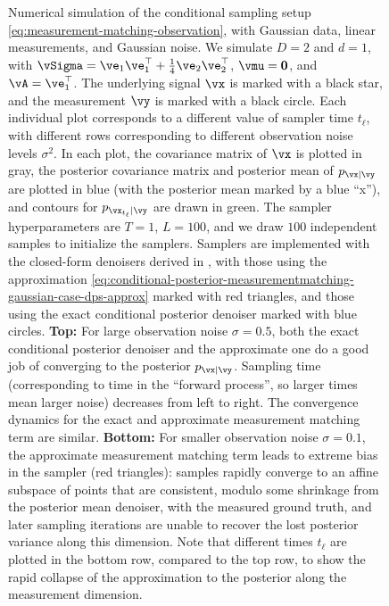 \documentclass[../../book-main.tex]{subfiles}
\begin{document}
\begin{example}
\begin{figure}[tbp]
    \caption{Numerical simulation of the conditional sampling setup
    \eqref{eq:measurement-matching-observation}, with Gaussian data, linear
    measurements, and Gaussian noise. We simulate $D=2$ and $d=1$, with $\vSigma
    = \ve_1 \ve_1^\top + \tfrac{1}{4} \ve_2 \ve_2^\top$, $\vmu = \Zero$, and
    $\vA = \ve_1^\top$. The underlying signal $\vx$ is marked with a black star,
    and the measurement $\vy$ is marked with a black circle.
    Each individual plot corresponds to a different value of sampler time
    $t_{\ell}$, with different rows corresponding to different observation noise
    levels $\sigma^2$.
    In each plot, the covariance matrix of $\vx$ is plotted in gray, the
    posterior covariance matrix and posterior mean of $p_{\vx \mid \vy}$ are
    plotted in blue (with the posterior mean marked by a blue ``x''), and
    contours for $p_{\vx_{t_{\ell}} \mid \vy}$ are drawn in green. The sampler
    hyperparameters are $T=1$, $L=100$, and we draw $100$
    independent samples to initialize the samplers. Samplers are implemented
    with the closed-form denoisers derived in
    , with those using the
    approximation
    \eqref{eq:conditional-posterior-measurementmatching-gaussian-case-dps-approx}
    marked with red triangles, and those using the exact conditional posterior
    denoiser marked with blue circles.
    \textbf{Top:} For large observation noise $\sigma = 0.5$, both the exact
    conditional posterior denoiser and the approximate one do a good job of
    converging to the posterior $p_{\vx \mid \vy}$. Sampling time (corresponding
    to time in the ``forward process'', so larger times mean larger noise)
    decreases from left to right.  The convergence dynamics for the exact and
    approximate measurement matching term are similar. \textbf{Bottom:} For
    smaller observation noise $\sigma = 0.1$, the
    approximate measurement matching term leads to extreme bias in the sampler
    (red triangles): samples rapidly converge to an affine subspace
    of points that are consistent, modulo some shrinkage from the posterior mean
    denoiser, with the measured ground truth, and later sampling iterations are
    unable to recover the lost posterior variance along this dimension. Note
    that different times $t_{\ell}$ are plotted in the bottom row, compared to
    the top row, to show the rapid collapse of the approximation to the
    posterior along the measurement dimension.}
    \label{fig:conditional_sampling_computational_gaussian}
  \end{figure}


\end{example}
\end{document}
